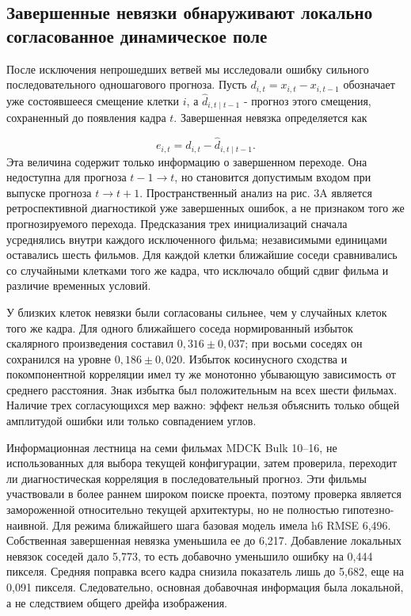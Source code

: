 \documentclass[11pt,a4paper]{article}
\begin{document}
\subsection{Завершенные невязки обнаруживают локально согласованное динамическое поле}
После исключения непрошедших ветвей мы исследовали ошибку сильного последовательного одношагового прогноза. Пусть $d_{i,t}=x_{i,t}-x_{i,t-1}$ обозначает уже состоявшееся смещение клетки $i$, а $\widehat d_{i,t\mid t-1}$ - прогноз этого смещения, сохраненный до появления кадра $t$. Завершенная невязка определяется как

\begin{equation}
e_{i,t}=d_{i,t}-\widehat d_{i,t\mid t-1}.
\end{equation}
Эта величина содержит только информацию о завершенном переходе. Она недоступна для прогноза $t-1\rightarrow t$, но становится допустимым входом при выпуске прогноза $t\rightarrow t+1$. Пространственный анализ на рис. 3A является ретроспективной диагностикой уже завершенных ошибок, а не признаком того же прогнозируемого перехода. Предсказания трех инициализаций сначала усреднялись внутри каждого исключенного фильма; независимыми единицами оставались шесть фильмов. Для каждой клетки ближайшие соседи сравнивались со случайными клетками того же кадра, что исключало общий сдвиг фильма и различие временных условий.

У близких клеток невязки были согласованы сильнее, чем у случайных клеток того же кадра. Для одного ближайшего соседа нормированный избыток скалярного произведения составил $0{,}316\pm0{,}037$; при восьми соседях он сохранился на уровне $0{,}186\pm0{,}020$. Избыток косинусного сходства и покомпонентной корреляции имел ту же монотонно убывающую зависимость от среднего расстояния. Знак избытка был положительным на всех шести фильмах. Наличие трех согласующихся мер важно: эффект нельзя объяснить только общей амплитудой ошибки или только совпадением углов.

Информационная лестница на семи фильмах MDCK Bulk 10--16, не использованных для выбора текущей конфигурации, затем проверила, переходит ли диагностическая корреляция в последовательный прогноз. Эти фильмы участвовали в более раннем широком поиске проекта, поэтому проверка является замороженной относительно текущей архитектуры, но не полностью гипотезно-наивной. Для режима ближайшего шага базовая модель имела h6 RMSE 6,496. Собственная завершенная невязка уменьшила ее до 6,217. Добавление локальных невязок соседей дало 5,773, то есть добавочно уменьшило ошибку на 0,444 пикселя. Средняя поправка всего кадра снизила показатель лишь до 5,682, еще на 0,091 пикселя. Следовательно, основная добавочная информация была локальной, а не следствием общего дрейфа изображения.
\end{document}
